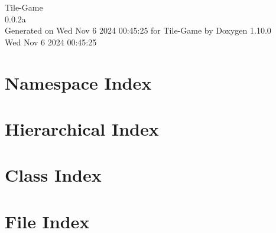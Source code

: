 \documentclass[twoside]{book}
\newcommand{\+}{\discretionary{\mbox{\scriptsize$\hookleftarrow$}}{}{}}
\newcommand{\clearemptydoublepage}{%
    \newpage{\pagestyle{empty}\cleardoublepage}%
  }
\begin{document}
  \raggedbottom
    \hypersetup{pageanchor=false,
                bookmarksnumbered=true,
                pdfencoding=unicode
               }
  \begin{titlepage}
  \vspace*{7cm}
  \begin{center}%
  {\Large Tile-\/\+Game}\\
  [1ex]\large 0.\+0.\+2a \\
  \vspace*{1cm}
  {\large Generated on Wed Nov 6 2024 00\+:45\+:25 for Tile-\/\+Game by Doxygen 1.10.0}\\
    \vspace*{0.5cm}
    {\small Wed Nov 6 2024 00:45:25}
  \end{center}
  \end{titlepage}
  \clearemptydoublepage
  \tableofcontents
  \clearemptydoublepage
  \hypersetup{pageanchor=true}
\chapter{Namespace Index}

\chapter{Hierarchical Index}

\chapter{Class Index}

\chapter{File Index}

\end{document}
